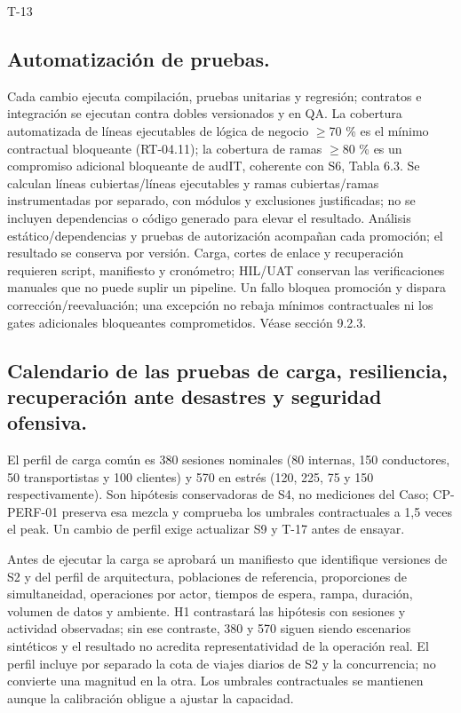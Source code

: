 \begin{formulario}{T-13}
\subsection*{Automatización de pruebas.}\label{sec:9-t13-4}
Cada cambio ejecuta compilación, pruebas unitarias y regresión; contratos e integración se ejecutan contra dobles versionados y en QA. La cobertura automatizada de líneas ejecutables de lógica de negocio \(\ge\)70 \% es el mínimo contractual bloqueante (RT-04.11); la cobertura de ramas \(\ge\)80 \% es un compromiso adicional bloqueante de audIT, coherente con S6, Tabla 6.3. Se calculan líneas cubiertas/líneas ejecutables y ramas cubiertas/ramas instrumentadas por separado, con módulos y exclusiones justificadas; no se incluyen dependencias o código generado para elevar el resultado. Análisis estático/dependencias y pruebas de autorización acompañan cada promoción; el resultado se conserva por versión. Carga, cortes de enlace y recuperación requieren script, manifiesto y cronómetro; HIL/UAT conservan las verificaciones manuales que no puede suplir un pipeline. Un fallo bloquea promoción y dispara corrección/reevaluación; una excepción no rebaja mínimos contractuales ni los gates adicionales bloqueantes comprometidos. Véase sección 9.2.3.

\subsection*{Calendario de las pruebas de carga, resiliencia, recuperación ante desastres y seguridad ofensiva.}\label{sec:9-t13-5}
El perfil de carga común es 380 sesiones nominales (80 internas, 150 conductores, 50 transportistas y 100 clientes) y 570 en estrés (120, 225, 75 y 150 respectivamente). Son hipótesis conservadoras de S4, no mediciones del Caso; CP-PERF-01 preserva esa mezcla y comprueba los umbrales contractuales a 1,5 veces el peak. Un cambio de perfil exige actualizar S9 y T-17 antes de ensayar.

Antes de ejecutar la carga se aprobará un manifiesto que identifique versiones de S2 y del perfil de arquitectura, poblaciones de referencia, proporciones de simultaneidad, operaciones por actor, tiempos de espera, rampa, duración, volumen de datos y ambiente. H1 contrastará las hipótesis con sesiones y actividad observadas; sin ese contraste, 380 y 570 siguen siendo escenarios sintéticos y el resultado no acredita representatividad de la operación real. El perfil incluye por separado la cota de viajes diarios de S2 y la concurrencia; no convierte una magnitud en la otra. Los umbrales contractuales se mantienen aunque la calibración obligue a ajustar la capacidad.


\end{formulario}
